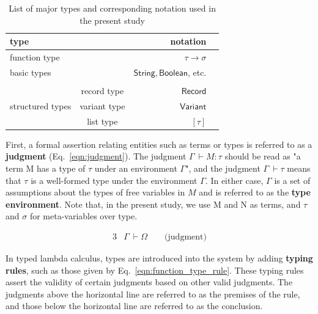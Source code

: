 \documentclass[preprint,3p,onecolumn,times,review]{article}
\begin{document}
{\begin{table}[!htbp]
  \centering
  \caption{List of major types and corresponding notation used in the present study}\label{tab:types_notations}
  \vspace{6pt}
  \begin{tabular}{lcrr}
    \toprule %
    type &  & notation \\
    \midrule
    function type &  & \(\tau \rightarrow \sigma \)\\
    basic types    &  & \(\mathsf{String}, \mathsf{Boolean}\), etc.\\
     &  \\
    & record type & \(\mathsf{Record}\)\\
    structured types & variant type & \(\mathsf{Variant}\)\\
    & list type & \([\tau]\)\\
    \bottomrule%
  \end{tabular}
\end{table}

First, a formal assertion relating entities such as terms or types is referred to as a {\bf judgment} (Eq.~\ref{eqn:judgment}).
The judgment  $\Gamma ~ \vdash M:\tau$ should be read as "a term M has a type of $\tau$ under an environment $\Gamma$", and the judgment $\Gamma ~ \vdash \tau$ means that $\tau$ is a well-formed type under the environment $\Gamma$. In either case, $\Gamma$  is a set of assumptions about the types of free variables in $M$ and is referred to as the {\bf type environment}.
Note that, in the present study, we use M and N as terms, and $\tau$ and $\sigma$ for meta-variables over type.

\begin{alignat}{3}
  & {\Gamma~ \vdash \Omega} \qquad  \text{(judgment)}  \label{eqn:judgment}
\end{alignat}


In typed lambda calculus, types are introduced into the system by adding {\bf typing rules}, such as those given by Eq.~\ref{eqn:function_type_rule}.
These typing rules assert the validity of certain judgments based on other valid judgments.
The judgments above the horizontal line are referred to as the premises of the rule, and those below the horizontal line are referred to as the conclusion.

}
\end{document}
